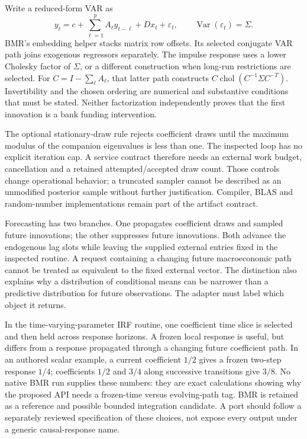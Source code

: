 Write a reduced-form VAR as
\[
 y_t=c+\sum_{\ell=1}^{p}A_\ell y_{t-\ell}+D x_t+\varepsilon_t,
 \qquad \operatorname{Var}(\varepsilon_t)=\Sigma.
\]
BMR's embedding helper stacks matrix row offsets. Its selected conjugate VAR path joins exogenous regressors separately. The impulse response uses a lower Cholesky factor of $\Sigma$, or a different construction when long-run restrictions are selected. For $C=I-\sum_\ell A_\ell$, that latter path constructs $C\operatorname{chol}(C^{-1}\Sigma C^{-T})$. Invertibility and the chosen ordering are numerical and substantive conditions that must be stated. Neither factorization independently proves that the first innovation is a bank funding intervention.~\citep{exec25_cdyn_bmr}

The optional stationary-draw rule rejects coefficient draws until the maximum modulus of the companion eigenvalues is less than one. The inspected loop has no explicit iteration cap. A service contract therefore needs an external work budget, cancellation and a retained attempted/accepted draw count. Those controls change operational behavior; a truncated sampler cannot be described as an unmodified posterior sample without further justification. Compiler, BLAS and random-number implementations remain part of the artifact contract.

Forecasting has two branches. One propagates coefficient draws and sampled future innovations; the other suppresses future innovations. Both advance the endogenous lag slots while leaving the supplied external entries fixed in the inspected routine. A request containing a changing future macroeconomic path cannot be treated as equivalent to the fixed external vector. The distinction also explains why a distribution of conditional means can be narrower than a predictive distribution for future observations. The adapter must label which object it returns.~\citep{exec25_cdyn_bmr}

In the time-varying-parameter IRF routine, one coefficient time slice is selected and then held across response horizons. A frozen local response is useful, but differs from a response propagated through a changing future coefficient path. In an authored scalar example, a current coefficient $1/2$ gives a frozen two-step response $1/4$; coefficients $1/2$ and $3/4$ along successive transitions give $3/8$. No native BMR run supplies these numbers: they are exact calculations showing why the proposed API needs a frozen-time versus evolving-path tag. BMR is retained as a reference and possible bounded integration candidate. A port should follow a separately reviewed specification of these choices, not expose every output under a generic causal-response name.~\citep{exec25_cdyn_bmr,exec25_cdyn_choice}

